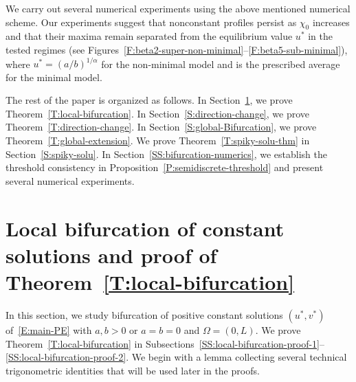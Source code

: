 \documentclass[11pt]{article} %
\theoremstyle{remark}
\theoremstyle{remark}
\numberwithin{equation}{section}
\numberwithin{figure}{section}
\numberwithin{table}{section}
\begin{document}
We carry out several numerical experiments using the above mentioned numerical
scheme. Our experiments suggest that nonconstant profiles persist as $\chi_0$
increases and that their maxima remain separated from the equilibrium value
$u^*$ in the tested regimes (see
Figures~\ref{F:beta2-super-non-minimal}--\ref{F:beta5-sub-minimal}), where $u^*
= (a/b)^{1/\alpha}$ for the non-minimal model and is the prescribed average for
the minimal model.

\smallskip

The rest of the paper is organized as follows. In
Section~\ref{S:local-Bifurcation}, we prove Theorem~\ref{T:local-bifurcation}.
In Section~\ref{S:direction-change}, we prove Theorem~\ref{T:direction-change}.
In Section~\ref{S:global-Bifurcation}, we prove
Theorem~\ref{T:global-extension}. We prove Theorem~\ref{T:spiky-solu-thm} in
Section~\ref{S:spiky-solu}. In Section~\ref{SS:bifurcation-numerics}, we
establish the threshold consistency in
Proposition~\ref{P:semidiscrete-threshold} and present several numerical
experiments.


\section{Local bifurcation of constant solutions  and proof of  Theorem~\ref{T:local-bifurcation}}
\label{S:local-Bifurcation}

In this section, we study bifurcation of positive constant solutions $(u^*,v^*)$
of~\eqref{E:main-PE} with $a, b > 0$ or $a = b = 0$ and $\Omega = (0,L)$. We
prove Theorem~\ref{T:local-bifurcation} in
Subsections~\ref{SS:local-bifurcation-proof-1}--\ref{SS:local-bifurcation-proof-2}.
We begin with a lemma collecting several technical trigonometric identities that
will be used later in the proofs.
\end{document}
